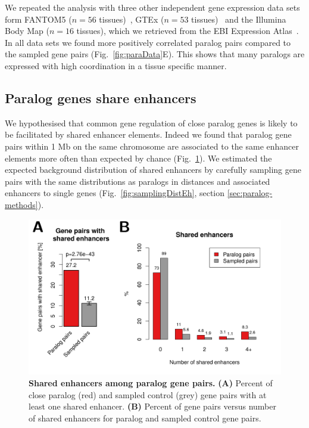 \documentclass[a4paper,twoside=true,openright,parskip=full,chapterprefix=true,11pt,headings=normal,bibliography=totoc,listof=totoc,titlepage=on,captions=tableabove,draft=false]{scrreprt}
\theoremstyle{definition}
\theoremstyle{definition}
\theoremstyle{definition}
\theoremstyle{remark}
\begin{document}
We repeated the analysis with three other independent gene expression
data sets form FANTOM5 (\(n=56\) tissues)~\citep{Forrest2014}, GTEx
(\(n=53\) tissues)~\citep{GTExConsortium2015} and the Illumina Body Map
(\(n=16\) tissues), which we retrieved from the EBI Expression
Atlas~\citep{Petryszak2015}. In all data sets we found more positively
correlated paralog pairs compared to the sampled gene pairs
(Fig.~\ref{fig:paraData}E). This shows that many paralogs are expressed
with high coordination in a tissue specific manner.

\hypertarget{paralog-genes-share-enhancers}{%
\subsection{Paralog genes share
enhancers}\label{paralog-genes-share-enhancers}}

We hypothesised that common gene regulation of close paralog genes is
likely to be facilitated by shared enhancer elements. Indeed we found
that paralog gene pairs within 1 Mb on the same chromosome are
associated to the same enhancer elements more often than expected by
chance (Fig.~\ref{fig:sharedEnhancer}). We estimated the expected
background distribution of shared enhancers by carefully sampling gene
pairs with the same distributions as paralogs in distances and
associated enhancers to single genes (Fig.~\ref{fig:samplingDistEh},
section \ref{sec:paralog-methods}).

\begin{figure}

{\centering \includegraphics[width=0.8\linewidth]{figures/paralog/fig2_09} 

}

\caption{\textbf{Shared enhancers among paralog gene pairs.
} \textbf{(A)} Percent of close paralog (red) and sampled control (grey)
gene pairs with at least one shared enhancer. \textbf{(B)} Percent of
gene pairs versus number of shared enhancers for paralog and sampled
control gene pairs.}\label{fig:sharedEnhancer}
\end{figure}
\end{document}
